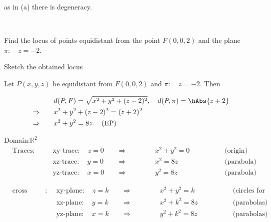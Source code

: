 \documentclass[11pt]{amsbook}
\begin{document}

\noindent as in (a) there is degeneracy.

\begin{exmp} \
\begin{hEnumerateAlpha}
\item Find the locus of points equidistant from the point $F(0,0,2)$ and the plane $\pi: \quad z=-2$.
\item Sketch the obtained locus
\end{hEnumerateAlpha}
\end{exmp}

\begin{hSolution}
\begin{hEnumerateAlpha}
\item Let $P(x,y,z)$ be equidistant from $F(0,0,2)$ and $\pi: \quad z=-2$. Then

\begin{align*}
    & &&d(P,F) = \sqrt{x^2+y^2+(z-2)^2},\quad d(P,\pi)=\hAbs{z+2}\\
    &\Rightarrow \quad &&x^2+y^2+(z-2)^2 = (z+2)^2\\
    &\Rightarrow \quad &&x^2+y^2 = 8z.\quad \text{(EP)}
\end{align*}

\item Domain:\quad  $\mathbb{R}^2$
\begin{align*}
&\text{Traces}: \quad && \text{xy-trace}: \quad z=0\quad &&&\Rightarrow \quad &&&& x^2+y^2 = 0 \quad &&&&& \text{(origin)}\\
& && \text{xz-trace}: \quad y=0 \quad &&&\Rightarrow \quad &&&& x^2=8z \quad &&&&& \text{(parabola)}\\
& && \text{yz-trace}: \quad x=0 \quad &&&\Rightarrow \quad &&&& y^2=8z \quad &&&&& \text{(parabola)}
\end{align*}

\begin{align*}
&\text{cross sections}: \quad && \text{xy-plane}: \quad z=k\quad &&&\Rightarrow \quad &&&& x^2+y^2 = k \quad &&&&& \text{(circles for k=0)}\\
& && \text{xz-plane}: \quad y=k \quad &&&\Rightarrow \quad &&&& x^2+k^2 =8z \quad &&&&& \text{(parabolas)}\\
& && \text{yz-plane}: \quad x=k \quad &&&\Rightarrow \quad &&&& y^2+k^2=8z \quad &&&&& \text{(parabolas)}
\end{align*}
\end{hEnumerateAlpha}
\end{hSolution}
\end{document}

